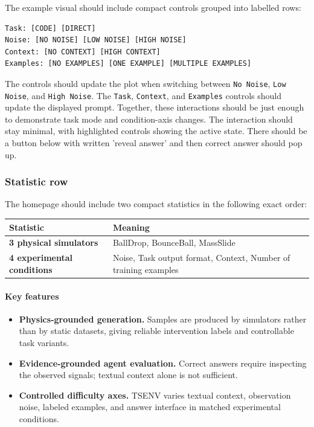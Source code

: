 \documentclass[11pt]{article}
\begin{document}
The example visual should include compact controls grouped into labelled rows:

\begin{verbatim}
Task: [CODE] [DIRECT]
Noise: [NO NOISE] [LOW NOISE] [HIGH NOISE]
Context: [NO CONTEXT] [HIGH CONTEXT]
Examples: [NO EXAMPLES] [ONE EXAMPLE] [MULTIPLE EXAMPLES]
\end{verbatim}

The controls should update the plot when switching between \texttt{No Noise}, \texttt{Low Noise}, and \texttt{High Noise}.
The \texttt{Task}, \texttt{Context}, and \texttt{Examples} controls should update the displayed prompt.
Together, these interactions should be just enough to demonstrate task mode and condition-axis changes.
The interaction should stay minimal, with highlighted controls showing the active state.
There should be a button below with written 'reveal answer' and then correct answer should pop up.


\subsubsection*{Statistic row}

The homepage should include two compact statistics in the following exact order:

\begin{center}
\begin{tabular}{ll}
\hline
\textbf{Statistic} & \textbf{Meaning} \\
\hline
\textbf{3 physical simulators} & BallDrop, BounceBall, MassSlide \\
\textbf{4 experimental conditions} & Noise, Task output format, Context, Number of training examples \\
\hline
\end{tabular}
\end{center}



\paragraph{Key features}
\begin{itemize}
  \item \textbf{Physics-grounded generation.} Samples are produced by simulators rather than by static datasets, giving reliable intervention labels and controllable task variants.
  \item \textbf{Evidence-grounded agent evaluation.} Correct answers require inspecting the observed signals; textual context alone is not sufficient.
  \item \textbf{Controlled difficulty axes.} TSENV varies textual context, observation noise, labeled examples, and answer interface in matched experimental conditions.
\end{itemize}
\end{document}
